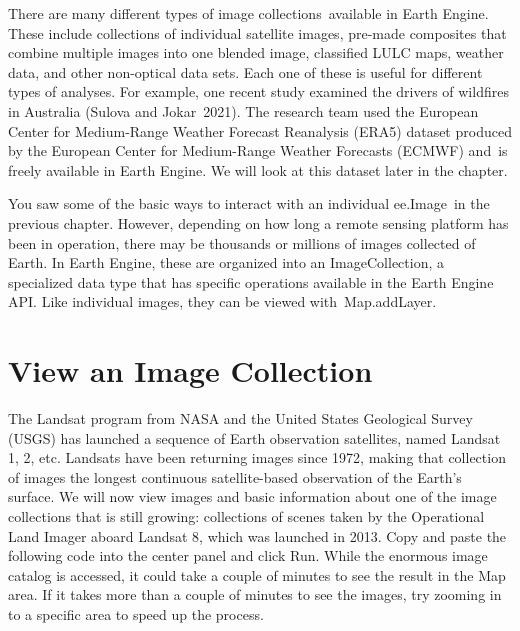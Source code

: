 \documentclass[
  letterpaper,
  DIV=11,
  numbers=noendperiod]{scrreprt}
\begin{document}
There are many different types of image collections~available in Earth
Engine. These include collections of individual satellite images,
pre-made composites that combine multiple images into one blended image,
classified LULC maps, weather data, and other non-optical data sets.
Each one of these is useful for different types of analyses. For
example, one recent study examined the drivers of wildfires in Australia
(Sulova and Jokar~2021). The research team used the European Center for
Medium-Range Weather Forecast Reanalysis (ERA5) dataset produced by the
European Center for Medium-Range Weather Forecasts (ECMWF) and~is freely
available in Earth Engine. We will look at this dataset later in the
chapter.

You saw some of the basic ways to interact with an individual
ee.Image~in the previous chapter. However, depending on how long a
remote sensing platform has been in operation, there may be thousands or
millions of images collected of Earth. In Earth Engine, these are
organized into an ImageCollection, a specialized data type that has
specific operations available in the Earth Engine API. Like individual
images, they can be viewed with~Map.addLayer.

\hypertarget{view-an-image-collection}{%
\section{View an Image Collection}\label{view-an-image-collection}}

The Landsat program from NASA and the United States Geological Survey
(USGS) has launched a sequence of Earth observation satellites, named
Landsat 1, 2, etc. Landsats have been returning images since 1972,
making that collection of images the longest continuous satellite-based
observation of the Earth's surface. We will now view images and basic
information about one of the image collections that is still growing:
collections of scenes taken by the Operational Land Imager aboard
Landsat 8, which was launched in 2013. Copy and paste the following code
into the center panel and click Run. While the enormous image catalog is
accessed, it could take a couple of minutes to see the result in the Map
area. If it takes more than a couple of minutes to see the images, try
zooming in to a specific area to speed up the process.
\end{document}
